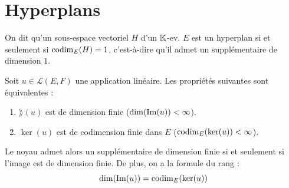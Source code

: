 \documentclass[11pt,a4paper]{report}
\begin{document}
\chapter{Hyperplans}

\begin{definition}
    On dit qu'un sous-espace vectoriel $H$ d'un $\mathbb{K}$-ev. $E$ est un hyperplan si et seulement si $\mathrm{codim}_E(H) = 1$, c'est-à-dire qu'il admet un supplémentaire de dimension $1$.
\end{definition}

\begin{proposition}
    Soit $u \in \mathcal L(E,F)$ une application linéaire. Les propriétés suivantes sont équivalentes :
    \begin{enumerate}
        \item $\rang(u)$ est de dimension finie ($\dim(\mathrm{Im}(u)) < \infty$).
        \item $\ker(u)$ est de codimension finie dans $E$ ($\mathrm{codim}_E(\ker(u)) < \infty$).
    \end{enumerate}
    Le noyau admet alors un supplémentaire de dimension finie si et seulement si l'image est de dimension finie. De plus, on a la formule du rang :
    $$\dim(\mathrm{Im}(u)) = \mathrm{codim}_E(\ker(u))$$
\end{proposition}
\end{document}
